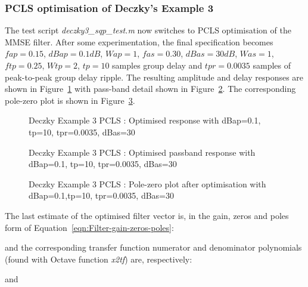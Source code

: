 \documentclass[a4paper,twoside,10pt,english]{report}
\begin{document}
\subsubsection{PCLS optimisation of Deczky's Example 3}
The test script \emph{deczky3\_sqp\_test.m} now switches to PCLS optimisation of
the MMSE filter. After some experimentation, the final specification becomes
$fap=0.15$, $dBap=0.1dB$, $Wap=1$, $fas=0.30$, $dBas=30dB$, $Was=1$, $ftp=0.25$,
$Wtp=2$, $tp=10$ samples group delay and $tpr=0.0035$ samples 
of peak-to-peak group delay ripple. The resulting amplitude and delay responses 
are shown in Figure~\ref{fig:Deczky-Example-3-PCLS-d1} with pass-band detail 
shown in Figure~\ref{fig:Deczky-Example-3-PCLS-d1-passband}. The corresponding 
pole-zero plot is shown in Figure~\ref{fig:Deczky-Example-3-PCLS-d1-pz}. 
\begin{figure}[!htb]
\begin{center}
\scalebox{0.7}{}
\caption{Deczky Example 3 PCLS : Optimised response with dBap=0.1, tp=10, tpr=0.0035, dBas=30}
\label{fig:Deczky-Example-3-PCLS-d1}
\end{center}
\end{figure}
\begin{figure}[!htb]
\begin{center}
\scalebox{0.7}{}
\caption{Deczky Example 3 PCLS : Optimised passband response with dBap=0.1, tp=10, tpr=0.0035, dBas=30}
\label{fig:Deczky-Example-3-PCLS-d1-passband}
\end{center}
\end{figure}
\begin{figure}[!htb]
\begin{center}
\scalebox{0.7}{}
\caption{Deczky Example 3 PCLS : Pole-zero plot after optimisation with dBap=0.1,tp=10, tpr=0.0035, dBas=30}
\label{fig:Deczky-Example-3-PCLS-d1-pz}
\end{center}
\end{figure}
The last estimate of the optimised filter vector is, in the gain, zeros and 
poles form of Equation~\ref{eqn:Filter-gain-zeros-poles}:
\begin{small}

\end{small}
and the corresponding transfer function numerator and denominator polynomials
(found with Octave function \emph{x2tf}) are, respectively:
\begin{small}

\end{small}
and
\begin{small}

\end{small}
\end{document}
